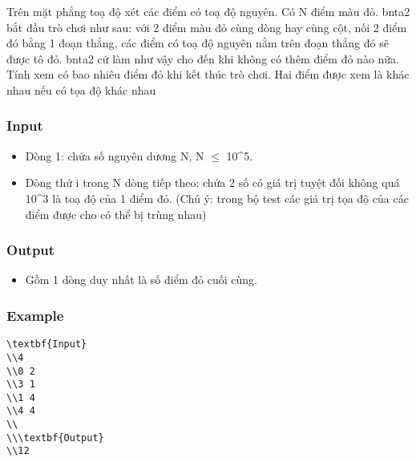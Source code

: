 



   Trên mặt phẳng toạ độ xét các điểm có toạ độ nguyên. Có N điểm màu đỏ. bnta2 bắt đầu trò chơi như sau: với 2 điểm màu đỏ cùng dòng hay cùng cột, nối 2 điểm đó bằng 1 đoạn thẳng, các điểm có toạ độ nguyên nằm trên đoạn thẳng đó sẽ được tô đỏ. bnta2 cứ làm như vậy cho đến khi không có thêm điểm đỏ nào nữa.   Tính xem có bao nhiêu điểm đỏ khi kết thúc trò chơi. Hai điểm được xem là khác nhau nếu có tọa độ khác nhau  

\subsubsection{   Input  }
\begin{itemize}
	\item     Dòng 1: chứa số nguyên dương N, N $\le$ 10^5.   
	\item     Dòng thứ i trong N dòng tiếp theo: chứa 2 số có giá trị tuyệt đối không quá 10^3 là toạ độ của 1 điểm đỏ. (Chú ý: trong bộ test các giá trị tọa độ của các điểm được cho có thể bị trùng nhau)   
\end{itemize}

\subsubsection{   Output  }
\begin{itemize}
	\item     Gồm 1 dòng duy nhất là số điểm đỏ cuối cùng.   
\end{itemize}

\subsubsection{   Example  }
\begin{verbatim}
\textbf{Input}
\\4 
\\0 2 
\\3 1 
\\1 4 
\\4 4 
\\
\\\textbf{Output}
\\12\end{verbatim}
